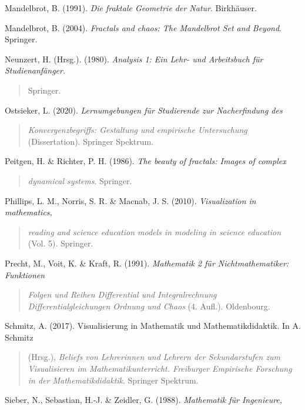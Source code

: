 \documentclass[a4paper, 12pt]{book}
\begin{document}
Mandelbrot, B. (1991). \emph{Die fraktale Geometrie der Natur}.
Birkhäuser.

Mandelbrot, B. (2004). \emph{Fractals and chaos: The Mandelbrot Set and
Beyond}. Springer.

Neunzert, H. (Hrsg.). (1980). \emph{Analysis 1: Ein Lehr- und
Arbeitsbuch für Studienanfänger}.

\begin{quote}
Springer.
\end{quote}

Ostsieker, L. (2020). \emph{Lernumgebungen für Studierende zur
Nacherfindung des}

\begin{quote}
\emph{Konvergenzbegriffs: Gestaltung und empirische Untersuchung}
(Dissertation). Springer Spektrum.
\end{quote}

Peitgen, H. \& Richter, P. H. (1986). \emph{The beauty of fractals:
Images of complex}

\begin{quote}
\emph{dynamical systems}. Springer.
\end{quote}

Phillips, L. M., Norris, S. R. \& Macnab, J. S. (2010).
\emph{Visualization in mathematics,}

\begin{quote}
\emph{reading and science education models in modeling in science
education} (Vol. 5). Springer.
\end{quote}

Precht, M., Voit, K. \& Kraft, R. (1991). \emph{Mathematik 2 für
Nichtmathematiker: Funktionen}

\begin{quote}
\emph{Folgen und Reihen Differential und Integralrechnung
Differentialgleichungen Ordnung und Chaos} (4. Aufl.). Oldenbourg.
\end{quote}

Schmitz, A. (2017). Visualisierung in Mathematik und Mathematikdidaktik.
In A. Schmitz

\begin{quote}
(Hrsg.), \emph{Beliefs von Lehrerinnen und Lehrern der Sekundarstufen
zum Visualisieren im Mathematikunterricht. Freiburger Empirische
Forschung in der Mathematikdidaktik}. Springer Spektrum.
\end{quote}

Sieber, N., Sebastian, H.-J. \& Zeidler, G. (1988). \emph{Mathematik für
Ingenieure,}
\end{document}

